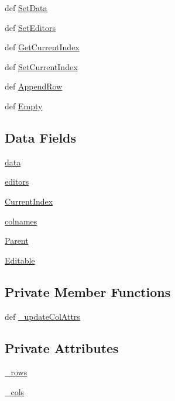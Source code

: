 \begin{CompactItemize}
def \hyperlink{classsubindextable_1_1SubindexTable_b3b87639c5b4973204a7004dfe779f61}{Set\-Data}
\item 
def \hyperlink{classsubindextable_1_1SubindexTable_fe11dbf7566e5d5bbb9fa496e2cd252e}{Set\-Editors}
\item 
def \hyperlink{classsubindextable_1_1SubindexTable_077e9fd84d8def000462c611f9b2032a}{Get\-Current\-Index}
\item 
def \hyperlink{classsubindextable_1_1SubindexTable_725ea4673a2c4a5c8046e4ab6d292135}{Set\-Current\-Index}
\item 
def \hyperlink{classsubindextable_1_1SubindexTable_8706c1886ece48bf683b0e6ced4811c7}{Append\-Row}
\item 
def \hyperlink{classsubindextable_1_1SubindexTable_c3b7a0e42be4036c5f4131e6c38e1c78}{Empty}
\end{CompactItemize}
\subsection*{Data Fields}
\begin{CompactItemize}
\item 
\hyperlink{classsubindextable_1_1SubindexTable_f7305b21e795d6e2203cd89dced09135}{data}
\item 
\hyperlink{classsubindextable_1_1SubindexTable_3d8a557d0b2f5886b1a843ba269ff68e}{editors}
\item 
\hyperlink{classsubindextable_1_1SubindexTable_4565d7d3a88f53b96a4abba5dc13f007}{Current\-Index}
\item 
\hyperlink{classsubindextable_1_1SubindexTable_6d5550af6dcf0c5561150056e5341bf5}{colnames}
\item 
\hyperlink{classsubindextable_1_1SubindexTable_654144476070b960f88f05dcb14ae26c}{Parent}
\item 
\hyperlink{classsubindextable_1_1SubindexTable_747986e24195de77f7c1e20a5a547c22}{Editable}
\end{CompactItemize}
\subsection*{Private Member Functions}
\begin{CompactItemize}
\item 
def \hyperlink{classsubindextable_1_1SubindexTable_1ec67dd0580844cc271088320cf5c0fb}{\_\-update\-Col\-Attrs}
\end{CompactItemize}
\subsection*{Private Attributes}
\begin{CompactItemize}
\item 
\hyperlink{classsubindextable_1_1SubindexTable_501fbeed9ff17247fb2376b4b5b1c936}{\_\-rows}
\item 
\hyperlink{classsubindextable_1_1SubindexTable_167f300b04601f8034e98dc89a3cacca}{\_\-cols}
\end{CompactItemize}


